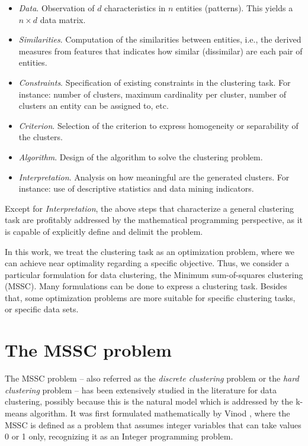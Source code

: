 \begin{itemize}

	\item \textit{Data}. Observation of $d$ characteristics in $n$ entities (patterns). This yields a $n \times d$ data matrix.

	\item \textit{Similarities}. Computation of the similarities between entities, i.e., the derived measures from features that indicates how similar (dissimilar) are each pair of entities.

	\item \textit{Constraints}. Specification of existing constraints in the clustering task. For instance: number of clusters, maximum cardinality per cluster, number of clusters an entity can be assigned to, etc.

	\item \textit{Criterion}. Selection of the criterion to express homogeneity or separability of the clusters.

	\item \textit{Algorithm}. Design of the algorithm to solve the clustering problem.

	\item \textit{Interpretation}. Analysis on how meaningful are the generated clusters. For instance: use of descriptive statistics and data mining indicators.

\end{itemize}

Except for \textit{Interpretation}, the above steps that characterize a general clustering task are profitably addressed by the mathematical programming perspective, as it is capable of explicitly define and delimit the problem.

In this work, we treat the clustering task as an optimization problem, where we can achieve near optimality regarding a specific objective. Thus, we consider a particular formulation for data clustering, the Minimum sum-of-squares clustering (MSSC). Many formulations can be done to express a clustering task. Besides that, some optimization problems are more suitable for specific clustering tasks, or specific data sets.

\section{The MSSC problem}
The MSSC problem -- also referred as the \textit{discrete clustering} problem or the \textit{hard clustering} problem -- has been extensively studied in the literature for data clustering, possibly because this is the natural model which is addressed by the k-means algorithm. It was first formulated mathematically by Vinod \cite{Vinod1969}, where the MSSC is defined as a problem that assumes integer variables that can take values 0 or 1 only, recognizing it as an Integer programming problem.

